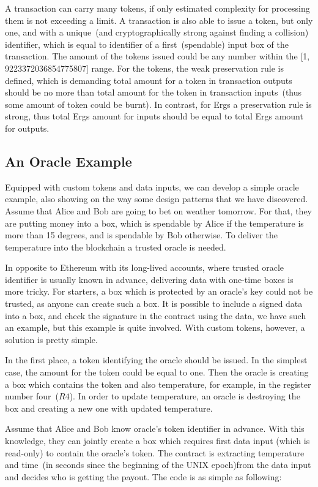  A transaction can carry many tokens, if only estimated complexity for processing them is not exceeding a limit. A
 transaction is also able to issue a token, but only one, and with a unique~(and cryptographically strong against
 finding a collision) identifier, which is equal to identifier of a first~(spendable) input box of the transaction.
 The amount of the tokens issued could be any number within the [1, 9223372036854775807] range. For the tokens, the weak
 preservation rule is defined, which is demanding total amount for a token in transaction outputs should be no more
 than total amount for the token in transaction inputs~(thus some amount of token could be burnt). In contrast, for Ergs
 a preservation rule is strong, thus total Ergs amount for inputs should be equal to total Ergs amount for outputs.

\subsection{An Oracle Example}
 \label{sec:platform}

 Equipped with custom tokens and data inputs, we can develop a simple oracle example, also showing on the way some
 design patterns that we have discovered. Assume that Alice and Bob are going to bet on weather tomorrow. For that,
 they are putting money into a box, which is spendable by
 Alice if the temperature is more than 15 degrees, and is spendable by Bob otherwise. To deliver the temperature into the
 blockchain a trusted oracle is needed.

 In opposite to Ethereum with its long-lived accounts, where trusted oracle identifier is usually known in advance,
 delivering data with one-time boxes is more tricky. For starters, a box which is protected by an oracle's key could
 not be trusted, as anyone can create such a box. It is possible to include a signed data into a box, and check the
 signature in the contract using the data, we have such an example, but this example is quite involved. With custom
 tokens, however, a solution is pretty simple.

 In the first place, a token identifying the oracle should be issued. In the simplest case, the amount for the token could
 be equal to one. Then the oracle is creating a box which contains the token and also temperature, for example, in the
 register number four~($R4$). In order to update temperature, an oracle is destroying the box and creating a
 new one with updated temperature.

 Assume that Alice and Bob know oracle's token identifier in advance. With this knowledge, they
 can jointly create a box which requires first data input (which is read-only) to contain the oracle's token. The
 contract is extracting temperature and time~(in seconds since the beginning of the UNIX epoch)from the data input
 and decides who is getting the payout. The code is as simple as following:

